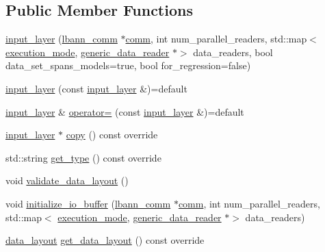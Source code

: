 \subsection*{Public Member Functions}
\begin{DoxyCompactItemize}
\item 
\hyperlink{classlbann_1_1input__layer_aad8b042899d86f5b7904d9d2653b5181}{input\+\_\+layer} (\hyperlink{classlbann_1_1lbann__comm}{lbann\+\_\+comm} $\ast$\hyperlink{file__io_8cpp_ab048c6f9fcbcfaa57ce68b00263dbebe}{comm}, int num\+\_\+parallel\+\_\+readers, std\+::map$<$ \hyperlink{base_8hpp_a2781a159088df64ed7d47cc91c4dc0a8}{execution\+\_\+mode}, \hyperlink{classlbann_1_1generic__data__reader}{generic\+\_\+data\+\_\+reader} $\ast$$>$ data\+\_\+readers, bool data\+\_\+set\+\_\+spans\+\_\+models=true, bool for\+\_\+regression=false)
\item 
\hyperlink{classlbann_1_1input__layer_a5f009de9aa2d51c78cf28068218d8bb9}{input\+\_\+layer} (const \hyperlink{classlbann_1_1input__layer}{input\+\_\+layer} \&)=default
\item 
\hyperlink{classlbann_1_1input__layer}{input\+\_\+layer} \& \hyperlink{classlbann_1_1input__layer_a8b00d107daef436d141344277526b682}{operator=} (const \hyperlink{classlbann_1_1input__layer}{input\+\_\+layer} \&)=default
\item 
\hyperlink{classlbann_1_1input__layer}{input\+\_\+layer} $\ast$ \hyperlink{classlbann_1_1input__layer_a02eb5e9b97c1da48997995cb89d297ec}{copy} () const override
\item 
std\+::string \hyperlink{classlbann_1_1input__layer_af596126d1b2d1604743906d04d32419b}{get\+\_\+type} () const override
\item 
void \hyperlink{classlbann_1_1input__layer_ae3c46c7e4d99b736ce8a3261abeac3e7}{validate\+\_\+data\+\_\+layout} ()
\item 
void \hyperlink{classlbann_1_1input__layer_a645fce2e882892ac0ad8c9b06ea6ed09}{initialize\+\_\+io\+\_\+buffer} (\hyperlink{classlbann_1_1lbann__comm}{lbann\+\_\+comm} $\ast$\hyperlink{file__io_8cpp_ab048c6f9fcbcfaa57ce68b00263dbebe}{comm}, int num\+\_\+parallel\+\_\+readers, std\+::map$<$ \hyperlink{base_8hpp_a2781a159088df64ed7d47cc91c4dc0a8}{execution\+\_\+mode}, \hyperlink{classlbann_1_1generic__data__reader}{generic\+\_\+data\+\_\+reader} $\ast$$>$ data\+\_\+readers)
\item 
\hyperlink{base_8hpp_a786677cbfb3f5677b4d84f3056eb08db}{data\+\_\+layout} \hyperlink{classlbann_1_1input__layer_ae8556702a6c04aeeec8d5eea2d0e90e6}{get\+\_\+data\+\_\+layout} () const override

\end{DoxyCompactItemize}
